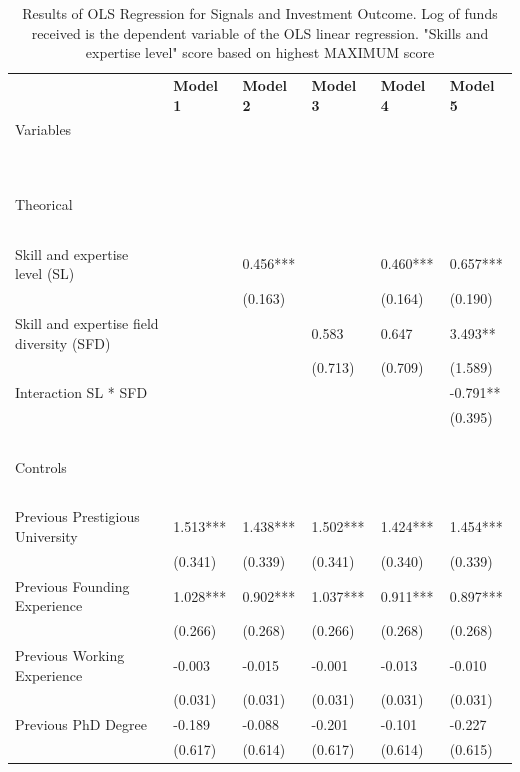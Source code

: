 \documentclass[12pt]{article}
\begin{document}
\begin{table}[!ht]
\scriptsize
    \centering
    \caption{Results of OLS Regression for Signals and Investment Outcome. Log of funds received is the dependent variable of the OLS linear regression. "Skills and expertise level" score based on highest MAXIMUM score}
    \begin{tabular}{llllll}
      \toprule
        ~ & \textbf{Model 1} & \textbf{Model 2} & \textbf{Model 3} & \textbf{Model 4} & \textbf{Model 5} \\
        Variables & ~ & ~ & ~ & ~ & ~ \\
        ~ & ~ & ~ & ~ & ~ & ~ \\
        \midrule
        ~ & ~ & ~ & ~ & ~ & ~ \\
        Theorical & ~ & ~ & ~ & ~ & ~ \\
        & ~ & ~ & ~ & ~ & ~ \\
        Skill and expertise level (SL) & ~ & 0.456*** & ~ & 0.460*** & 0.657*** \\
        ~ & ~ & (0.163) & ~ & (0.164) & (0.190) \\
        Skill and expertise field diversity (SFD) & ~ & ~ & 0.583 & 0.647 & 3.493** \\
        ~ & ~ & ~ & (0.713) & (0.709) & (1.589) \\
        Interaction SL * SFD & ~ & ~ & ~ & ~ & -0.791** \\
        ~ & ~ & ~ & ~ & ~ & (0.395) \\
        ~ & ~ & ~ & ~ & ~ & ~ \\
        Controls & ~ & ~ & ~ & ~ & ~ \\
        & ~ & ~ & ~ & ~ & ~ \\
        Previous Prestigious University & 1.513*** & 1.438*** & 1.502*** & 1.424*** & 1.454*** \\
        ~ & (0.341) & (0.339) & (0.341) & (0.340) & (0.339) \\
        Previous Founding Experience & 1.028*** & 0.902*** & 1.037*** & 0.911*** & 0.897*** \\
        ~ & (0.266) & (0.268) & (0.266) & (0.268) & (0.268) \\
        Previous Working Experience & -0.003 & -0.015 & -0.001 & -0.013 & -0.010 \\
        ~ & (0.031) & (0.031) & (0.031) & (0.031) & (0.031) \\
        Previous PhD Degree & -0.189 & -0.088 & -0.201 & -0.101 & -0.227 \\
        ~ & (0.617) & (0.614) & (0.617) & (0.614) & (0.615) \\

\end{tabular}
\end{table}
\end{document}
